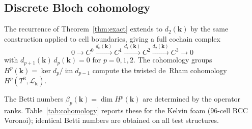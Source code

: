 \documentclass[preprint,12pt]{elsarticle}
\begin{document}
\subsection{Discrete Bloch cohomology}
\label{sec:cohomology}

The recurrence of Theorem~\ref{thm:exact} extends to $d_2(\mathbf{k})$ by the same construction applied to cell boundaries, giving a full cochain complex
\begin{equation}\label{eq:fullcomplex}
  0 \to C^0 \xrightarrow{d_0(\mathbf{k})} C^1 \xrightarrow{d_1(\mathbf{k})} C^2 \xrightarrow{d_2(\mathbf{k})} C^3 \to 0
\end{equation}
with $d_{p+1}(\mathbf{k})\,d_p(\mathbf{k}) = 0$ for $p = 0, 1, 2$. The cohomology groups $H^p(\mathbf{k}) = \ker d_p / \operatorname{im} d_{p-1}$ compute the twisted de~Rham cohomology $H^p(T^3, \mathcal{L}_\mathbf{k})$.

The Betti numbers $\beta_p(\mathbf{k}) = \dim H^p(\mathbf{k})$ are determined by the operator ranks. Table~\ref{tab:cohomology} reports these for the Kelvin foam (96-cell BCC Voronoi); identical Betti numbers are obtained on all test structures.
\end{document}
